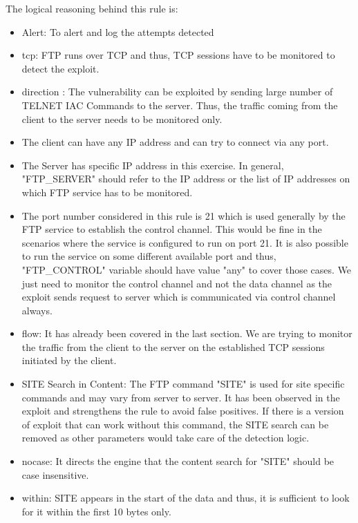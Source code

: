 \documentclass[11pt, pdftex]{article}
\begin{document}
\begin{enumerate}
The logical reasoning behind this rule is:
\begin{itemize}
	\item Alert: To alert and log the attempts detected
	\item tcp: FTP runs over TCP and thus, TCP sessions have to be monitored to detect the exploit.
	\item direction : The vulnerability can be exploited by sending large number of TELNET IAC Commands to the server. Thus, the traffic coming from the client to the server needs to be monitored only.
	\item The client can have any IP address and can try to connect via any port.
	\item The Server has specific IP address in this exercise. In general, "FTP\_SERVER" should refer to the IP address or the list of IP addresses on which FTP service has to be monitored.
	\item The port number considered in this rule is 21 which is used generally by the FTP service to establish the control channel. This would be fine in the scenarios where the service is configured to run on port 21. It is also possible to run the service on some different available port and thus, "FTP\_CONTROL" variable should have value "any" to cover those cases. We just need to monitor the control channel and not the data channel as the exploit sends request to server which is communicated via control channel always.
	\item flow: It has already been covered in the last section. We are trying to monitor the traffic from the client to the server on the established TCP sessions initiated by the client.
	\item SITE Search in Content: The FTP command "SITE" is used for site specific commands and may vary from server to server. It has been observed in the exploit and strengthens the rule to avoid false positives. If there is a version of exploit that can work without this command, the SITE search can be removed as other parameters would take care of the detection logic.
	\item nocase: It directs the engine that the content search for "SITE" should be case insensitive.
	\item within: SITE appears in the start of the data and thus, it is sufficient to look for it within the first 10 bytes only.

\end{itemize}
\end{enumerate}
\end{document}
